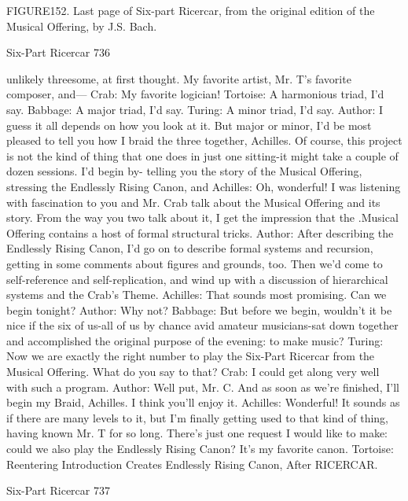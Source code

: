 FIGURE152. Last page of Six-part Ricercar, from the original edition of the Musical
  Offering, by J.S. Bach.



Six-Part Ricercar                                                                     736

unlikely threesome, at first thought. My favorite artist, Mr. T's favorite composer, and---
Crab: My favorite logician!
Tortoise: A harmonious triad, I'd say.
Babbage: A major triad, I'd say.
Turing: A minor triad, I'd say.
Author: I guess it all depends on how you look at it. But major or minor, I'd be most
   pleased to tell you how I braid the three together, Achilles. Of course, this project is
   not the kind of thing that one does in just one sitting-it might take a couple of dozen
   sessions. I'd begin by- telling you the story of the Musical Offering, stressing the
   Endlessly Rising Canon, and
Achilles: Oh, wonderful! I was listening with fascination to you and Mr. Crab talk about
   the Musical Offering and its story. From the way you two talk about it, I get the
   impression that the .Musical Offering contains a host of formal structural tricks.
Author: After describing the Endlessly Rising Canon, I'd go on to describe formal
   systems and recursion, getting in some comments about figures and grounds, too.
   Then we'd come to self-reference and self-replication, and wind up with a discussion
   of hierarchical systems and the Crab's Theme.
Achilles: That sounds most promising. Can we begin tonight?
Author: Why not?
Babbage: But before we begin, wouldn't it be nice if the six of us-all of us by chance avid
   amateur musicians-sat down together and accomplished the original purpose of the
   evening: to make music?
Turing: Now we are exactly the right number to play the Six-Part Ricercar from the
   Musical Offering. What do you say to that?
Crab: I could get along very well with such a program.
Author: Well put, Mr. C. And as soon as we're finished, I'll begin my Braid, Achilles. I
   think you'll enjoy it.
Achilles: Wonderful! It sounds as if there are many levels to it, but I'm finally getting
   used to that kind of thing, having known Mr. T for so long. There's just one request I
   would like to make: could we also play the Endlessly Rising Canon? It's my favorite
   canon.
Tortoise: Reentering Introduction Creates Endlessly Rising Canon, After RICERCAR.




Six-Part Ricercar                                                                      737

